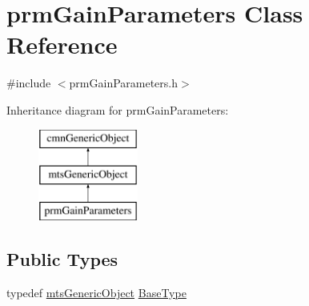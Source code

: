 \hypertarget{classprm_gain_parameters}{\section{prm\-Gain\-Parameters Class Reference}
\label{classprm_gain_parameters}
}


{\ttfamily \#include $<$prm\-Gain\-Parameters.\-h$>$}

Inheritance diagram for prm\-Gain\-Parameters\-:\begin{figure}[H]
\begin{center}
\leavevmode
\includegraphics[height=3.000000cm]{de/d09/classprm_gain_parameters}
\end{center}
\end{figure}
\subsection*{Public Types}
\begin{DoxyCompactItemize}
\item 
typedef \hyperlink{classmts_generic_object}{mts\-Generic\-Object} \hyperlink{classprm_gain_parameters_ac13e32cd34eafe7bd371cf0fe7735838}{Base\-Type}
\end{DoxyCompactItemize}
